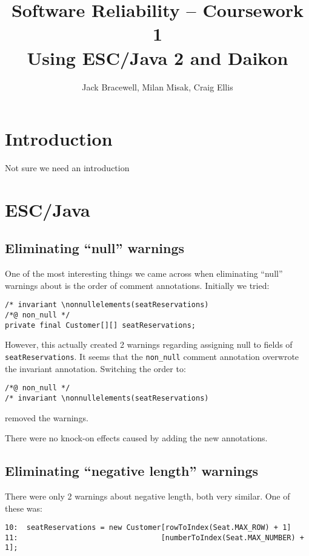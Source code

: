 \documentclass[11pt]{article}
\title{Software Reliability -- Coursework 1 \\ Using ESC/Java 2 and Daikon}
\author{Jack Bracewell, Milan Misak, Craig Ellis}
\date{}
\begin{document}
\maketitle

\section{Introduction}

Not sure we need an introduction

\section{ESC/Java}

\subsection{Eliminating ``null'' warnings}

One of the most interesting things we came across when eliminating ``null'' warnings about is the order of comment annotations. Initially we tried:

\noindent
\begin{verbatim}
/* invariant \nonnullelements(seatReservations)
/*@ non_null */
private final Customer[][] seatReservations;
\end{verbatim}

However, this actually created 2 warnings regarding assigning null to fields of \verb|seatReservations|. It seems that the \verb|non_null| comment annotation overwrote the invariant annotation. Switching the order to:

\noindent
\begin{verbatim}
/*@ non_null */
/* invariant \nonnullelements(seatReservations)
\end{verbatim}

removed the warnings.

There were no knock-on effects caused by adding the new annotations.

\subsection{Eliminating ``negative length'' warnings}

There were only 2 warnings about negative length, both very similar. One of these was:

\noindent
\begin{verbatim}
10:  seatReservations = new Customer[rowToIndex(Seat.MAX_ROW) + 1]
11:                                 [numberToIndex(Seat.MAX_NUMBER) + 1];
\end{verbatim}
\end{document}
